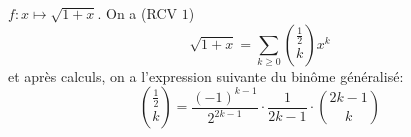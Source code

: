 \begin{ex}
    $f:x\longmapsto \sqrt{1+x}$. On a (RCV $1$) \[
        \sqrt{1+x}=\sum_{k\geq 0}\binom {\frac12}kx^k
    \]
    et après calculs, on a l'expression suivante du binôme généralisé: \[
        \binom{\frac12}k=\frac{(-1)^{k-1}}{2^{2k-1}}\cdot \frac1{2k-1}\cdot \binom{2k-1}k
    \]
\end{ex}

